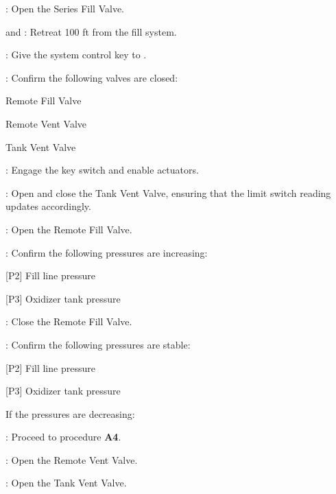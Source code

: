 \begin{checklist}
    \item \primary: Open the Series Fill Valve.
    \item \primary{} and \secondary{}: Retreat 100 ft from the fill system.
    \item \ops{}: Give the system control key to \control{}.
    \item \control{}: Confirm the following valves are closed:
    \begin{checklist}
        \item Remote Fill Valve
        \item Remote Vent Valve
        \item Tank Vent Valve
    \end{checklist}
    \item \control{}: Engage the key switch and enable actuators.
    \item \control{}: Open and close the Tank Vent Valve, ensuring that the limit switch reading updates accordingly.
    \item \control{}: Open the Remote Fill Valve.
    \item \control{}: Confirm the following pressures are increasing:
    \begin{checklist}
        \item {[P2]} Fill line pressure
        \item {[P3]} Oxidizer tank pressure
    \end{checklist}
    \item \control{}: Close the Remote Fill Valve.
    \item \control{}: Confirm the following pressures are stable:
    \begin{checklist}
        \item {[P2]} Fill line pressure
        \item {[P3]} Oxidizer tank pressure
    \end{checklist}
    \begin{checklist}[label=$\bullet$]
        \item If the pressures are decreasing:
        \begin{checklist}
            \item \ops{}: Proceed to procedure \textbf{A4}.
        \end{checklist}
    \end{checklist}
    \item \control{}: Open the Remote Vent Valve.
    \item \control{}: Open the Tank Vent Valve.

\end{checklist}
